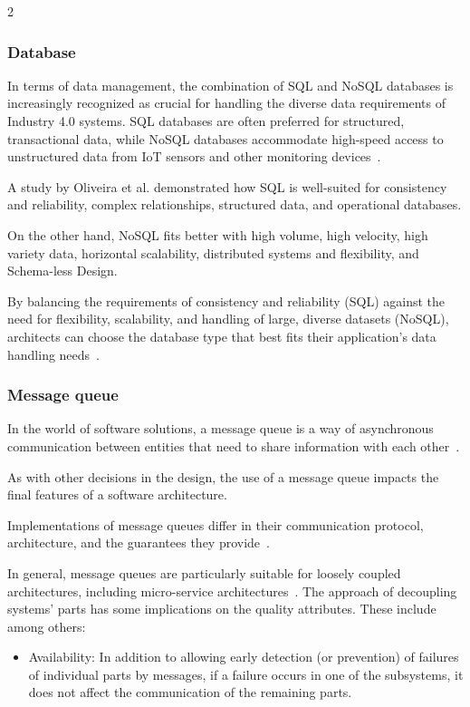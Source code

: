 \documentclass{article}
\begin{document}
\begin{multicols}{2}
\subsubsection{Database}
In terms of data management, the combination of SQL and NoSQL databases is increasingly recognized as crucial for handling the diverse data requirements of Industry 4.0 systems. SQL databases are often preferred for structured, transactional data, while NoSQL databases accommodate high-speed access to unstructured data from IoT sensors and other monitoring devices~\cite{b2}. 

A study by Oliveira et al. demonstrated how SQL is well-suited for consistency and reliability, complex relationships, structured data, and operational databases.

On the other hand, NoSQL fits better with high volume, high velocity, high variety data, horizontal scalability, distributed systems and flexibility, and Schema-less Design. 

By balancing the requirements of consistency and reliability (SQL) against the need for flexibility, scalability, and handling of large, diverse datasets (NoSQL), architects can choose the database type that best fits their application's data handling needs~\cite{b2}.

\subsubsection{Message queue}
In the world of software solutions, a message queue is a way of asynchronous communication between entities that need to share information with each other~\cite{Reagan2017Dec}.

As with other decisions in the design, the use of a message queue impacts the final features of a software architecture.

Implementations of message queues differ in their communication protocol, architecture, and the guarantees they provide~\cite{Fu2020Dec}.

In general, message queues are particularly suitable for loosely coupled architectures, including micro-service architectures~\cite{dossot2014rabbitmq}.
The approach of decoupling systems' parts has some implications on the quality attributes. These include among others:

\begin{itemize}
    \item Availability: In addition to allowing early detection (or prevention) of failures of individual parts by messages, if a failure occurs in one of the subsystems, it does not affect the communication of the remaining parts.
    

\end{itemize}
\end{multicols}
\end{document}
